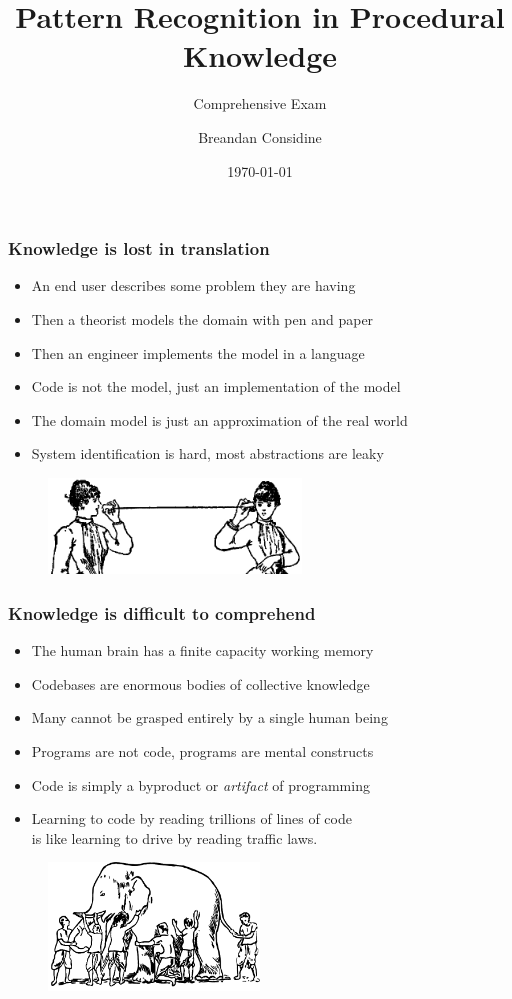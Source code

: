 \documentclass{beamer}
\title{Pattern Recognition in Procedural Knowledge}
\subtitle{Comprehensive Exam}
\author{Breandan Considine}
\institute[McGill]{
McGill University \\
\medskip
\textit{breandan.considine@mcgill.ca}
}
\date{\today}
\begin{document}
  \begin{frame}
    \titlepage
  \end{frame}

  \begin{frame}
    \frametitle{Knowledge is lost in translation}
    \begin{itemize}
      \item An end user describes some problem they are having
      \item Then a theorist models the domain with pen and paper
      \item Then an engineer implements the model in a language
      \item Code is not the model, just an implementation of the model
      \item The domain model is just an approximation of the real world
      \item System identification is hard, most abstractions are leaky
    \end{itemize}
    \begin{figure}[H]
      \centering
      \includegraphics[width=0.6\textwidth]{../clipart/tincan.jpg}
    \end{figure}
  \end{frame}

  \begin{frame}
    \frametitle{Knowledge is difficult to comprehend}
    \begin{itemize}
      \item The human brain has a finite capacity working memory
      \item Codebases are enormous bodies of collective knowledge
      \item Many cannot be grasped entirely by a single human being
      \item Programs are not code, programs are mental constructs
      \item Code is simply a byproduct or \textit{artifact} of programming
      \item Learning to code by reading trillions of lines of code \\is like learning to drive by reading traffic laws.
    \end{itemize}
    \begin{figure}[H]
      \centering
      \includegraphics[width=0.5\textwidth]{../clipart/elephant.png}
    \end{figure}
  \end{frame}
\end{document}
